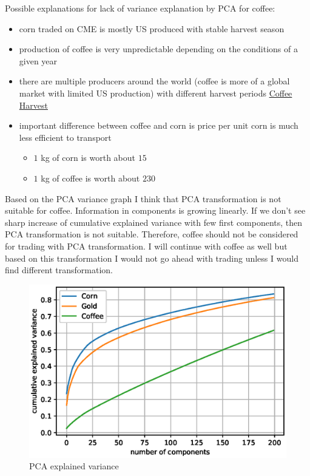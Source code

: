 \documentclass[final,2p]{elsarticle}
\begin{document}
Possible explanations for lack of variance explanation by PCA for coffee:
\begin{itemize}
    \item corn traded on CME is mostly US produced with stable harvest season
    \item production of coffee is very unpredictable depending on the conditions of a given year
    \item there are multiple producers around the world (coffee is more of a global market with limited US production) with different harvest periods \href{https://driftaway.coffee/when-is-coffee-harvested/}{Coffee Harvest}
    \item important difference between coffee and corn is price per unit corn is much less efficient to transport
        \begin{itemize}
            \item $1$ kg of corn is worth about $15$\textcent
            \item $1$ kg of coffee is worth about $230$\textcent
        \end{itemize}
\end{itemize}
    
Based on the PCA variance graph I think that PCA transformation is not suitable for coffee. Information in components is growing linearly. If we don't see sharp increase of cumulative explained variance with few first components, then PCA transformation is not suitable. Therefore, coffee should not be considered for trading with PCA transformation. I will continue with coffee as well but based on this transformation I would not go ahead with trading unless I would find different transformation.
\begin{figure}[h]
    \centering
    \includegraphics[width = 5in]{figures/pca.eps}
    \caption{PCA explained variance}
\end{figure}
\end{document}
